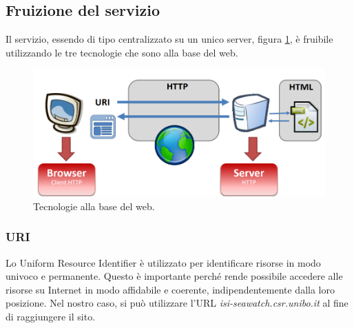 \documentclass[a4paper,final,12pt]{report}
\begin{document}
\subsection{Fruizione del servizio}
Il servizio, essendo di tipo centralizzato su un unico server, figura \ref{figura:tecbasewebcasa}, è fruibile utilizzando le tre tecnologie che sono alla base del web.
\begin{figure}[hbtp]
\centering
\includegraphics[scale=0.60]{img_concettuale/tecnologie.png}
\caption{Tecnologie alla base del web.}
\label{figura:tecbasewebcasa}
\end{figure} 

\subsubsection{URI}
Lo Uniform Resource Identifier è utilizzato per identificare risorse in modo univoco e permanente. Questo è importante perché rende possibile accedere alle risorse su Internet in modo affidabile e coerente, indipendentemente dalla loro posizione. Nel nostro caso, si può utilizzare l'URL \textit{isi-seawatch.csr.unibo.it} al fine di raggiungere il sito.
\end{document}
